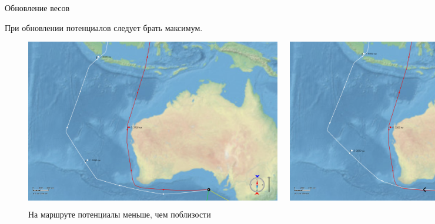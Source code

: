 \documentclass[russian, hyperref={unicode}]{beamer}
\begin{document}
\begin{frame}[noframenumbering]{Обновление весов}
{        \begin{center}
            При обновлении потенциалов следует брать максимум.
        \end{center}
    }
   
     {
        \begin{figure}
          \begin{columns}
            \includegraphics[clip=true, trim = 300pt 20pt 330pt 350pt,
            width=\textwidth]{Solution/weights-on-path-bad}

            \includegraphics[clip=true, trim = 300pt 20pt 330pt 350pt,
            width=\textwidth]{Solution/weights-on-path-good}
          \end{columns}

            На маршруте потенциалы меньше, чем поблизости
        \end{figure}
    }
\end{frame}
\end{document}
